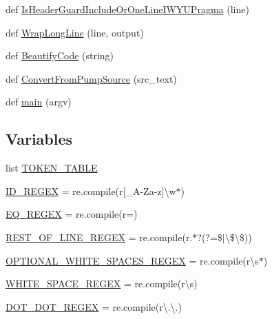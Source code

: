 \begin{DoxyCompactItemize}
\item 
def \mbox{\hyperlink{namespacepump_ac8a553b60dc83d100361a0e98d98451b}{Is\+Header\+Guard\+Include\+Or\+One\+Line\+I\+W\+Y\+U\+Pragma}} (line)
\item 
def \mbox{\hyperlink{namespacepump_a02427e2ddc80f0f408e27dfc3e38e702}{Wrap\+Long\+Line}} (line, output)
\item 
def \mbox{\hyperlink{namespacepump_a3456db8d85605892d670669c4e238cd7}{Beautify\+Code}} (string)
\item 
def \mbox{\hyperlink{namespacepump_a568fe53d1443489ac15bac4a0f9faf91}{Convert\+From\+Pump\+Source}} (src\+\_\+text)
\item 
def \mbox{\hyperlink{namespacepump_abcf26971f7bdbad77c2c168c110312df}{main}} (argv)
\end{DoxyCompactItemize}
\subsection*{Variables}
\begin{DoxyCompactItemize}
\item 
list \mbox{\hyperlink{namespacepump_a132b35d1104c7f479aa21c345f413477}{T\+O\+K\+E\+N\+\_\+\+T\+A\+B\+LE}}
\item 
\mbox{\hyperlink{namespacepump_a8e008923b6c378b8d3df611fb07d6dda}{I\+D\+\_\+\+R\+E\+G\+EX}} = re.\+compile(r\textquotesingle{}\mbox{[}\+\_\+A-\/Za-\/z\mbox{]}\textbackslash{}w$\ast$\textquotesingle{})
\item 
\mbox{\hyperlink{namespacepump_a6397ed9bab62b5c6f60a6626f6b287e0}{E\+Q\+\_\+\+R\+E\+G\+EX}} = re.\+compile(r\textquotesingle{}=\textquotesingle{})
\item 
\mbox{\hyperlink{namespacepump_a4c1f68b32fcb8366051b574cf2e6aef1}{R\+E\+S\+T\+\_\+\+O\+F\+\_\+\+L\+I\+N\+E\+\_\+\+R\+E\+G\+EX}} = re.\+compile(r\textquotesingle{}.$\ast$?(?=\$$\vert$\textbackslash{}\$\textbackslash{}\$)\textquotesingle{})
\item 
\mbox{\hyperlink{namespacepump_a81f03eaffd2c0f4c6a453a0b179e51ca}{O\+P\+T\+I\+O\+N\+A\+L\+\_\+\+W\+H\+I\+T\+E\+\_\+\+S\+P\+A\+C\+E\+S\+\_\+\+R\+E\+G\+EX}} = re.\+compile(r\textquotesingle{}\textbackslash{}s$\ast$\textquotesingle{})
\item 
\mbox{\hyperlink{namespacepump_a4ab1be351870f785a72d324bf56c8316}{W\+H\+I\+T\+E\+\_\+\+S\+P\+A\+C\+E\+\_\+\+R\+E\+G\+EX}} = re.\+compile(r\textquotesingle{}\textbackslash{}s\textquotesingle{})
\item 
\mbox{\hyperlink{namespacepump_a45644ad738e584ec754f6d9f45fe693c}{D\+O\+T\+\_\+\+D\+O\+T\+\_\+\+R\+E\+G\+EX}} = re.\+compile(r\textquotesingle{}\textbackslash{}.\textbackslash{}.\textquotesingle{})
\end{DoxyCompactItemize}


